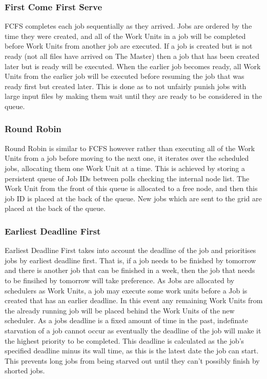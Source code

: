 \subsubsection{First Come First Serve}
FCFS completes each job sequentially as they arrived. Jobs are ordered by the time they were created, and all of the Work Units in a job will be completed before Work Units from another job are executed. If a job is created but is not ready (not all files have arrived on The Master) then a job that has been created later but is ready will be executed. When the earlier job becomes ready, all Work Units from the earlier job will be executed before resuming the job that was ready first but created later. This is done as to not unfairly punish jobs with large input files by making them wait until they are ready to be considered in the queue.

\subsubsection{Round Robin}
Round Robin is similar to FCFS however rather than executing all of the Work Units from a job before moving to the next one, it iterates over the scheduled jobs, allocating them one Work Unit at a time. This is achieved by storing a persistent queue of Job IDs between polls checking the internal node list. The Work Unit from the front of this queue is allocated to a free node, and then this job ID is placed at the back of the queue. New jobs which are sent to the grid are placed at the back of the queue.

\subsubsection{Earliest Deadline First}
Earliest Deadline First takes into account the deadline of the job and prioritises jobs by earliest deadline first. That is, if a job needs to be finished by tomorrow and there is another job that can be finished in a week, then the job that needs to be finsihed by tomorrow will take preference. As Jobs are allocated by schedulers as Work Units, a job may execute some work units before a Job is created that has an earlier deadline. In this event any remaining Work Units from the already running job will be placed behind the Work Units of the new scheduler. As a jobs deadline is a fixed amount of time in the past, indefinate starvation of a job cannot occur as eventually the deadline of the job will make it the highest priority to be completed. This deadline is calculated as the job's specified deadline minus its wall time, as this is the latest date the job can start. This prevents long jobs from being starved out until they can't possibly finish by shorted jobs.

